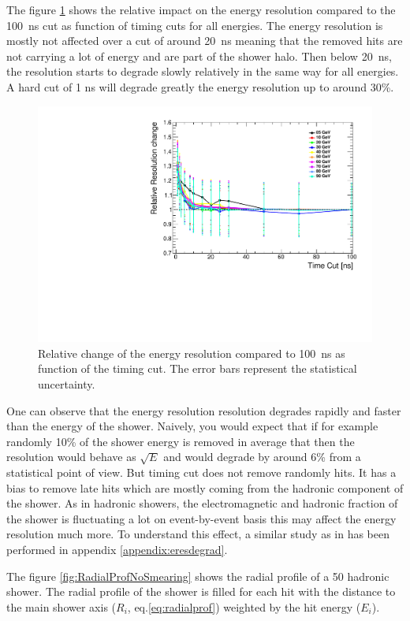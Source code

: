 The figure \ref{fig:resoRelativeNoSmearing} shows the relative impact on the energy resolution compared to the \SI{100}{\nano\second} cut as function of timing cuts for all energies. The energy resolution is mostly not affected over a cut of around \SI{20}{\nano\second} meaning that the removed hits are not carrying a lot of energy and are part of the shower halo. Then below \SI{20}{\nano\second}, the resolution starts to degrade slowly relatively in the same way for all energies. A hard cut of 1 ns will degrade greatly the energy resolution up to around 30\%.

\begin{figure}[htbp!]
  \centering
  \includegraphics[width=0.7\linewidth]{../Thesis_Plots/ILD/NoSmearing/Plots/ShowerReso_TimeCuts_noSmearing}
  \caption{Relative change of the energy resolution compared to \SI{100}{\nano\second} as function of the timing cut. The error bars represent the statistical uncertainty.} \label{fig:resoRelativeNoSmearing}
\end{figure}

One can observe that the energy resolution resolution degrades rapidly and faster than the energy of the shower. Naively, you would expect that if for example randomly 10\% of the shower energy is removed in average that then the resolution would behave as $\sqrt{E}$ and would degrade by around 6\% from a statistical point of view. But timing cut does not remove randomly hits. It has a bias to remove late hits which are mostly coming from the hadronic component of the shower. As in hadronic showers, the electromagnetic and hadronic fraction of the shower is fluctuating a lot on event-by-event basis this may affect the energy resolution much more. To understand this effect, a similar study as in \cite{SoftCompNew2012} has been performed in appendix \ref{appendix:eresdegrad}.

The figure \ref{fig:RadialProfNoSmearing} shows the radial profile of a 50 \GeV hadronic shower. The radial profile of the shower is filled for each hit with the distance to the main shower axis ($R_{i}$, eq.\ref{eq:radialprof})  weighted by the hit energy ($E_{i}$).

